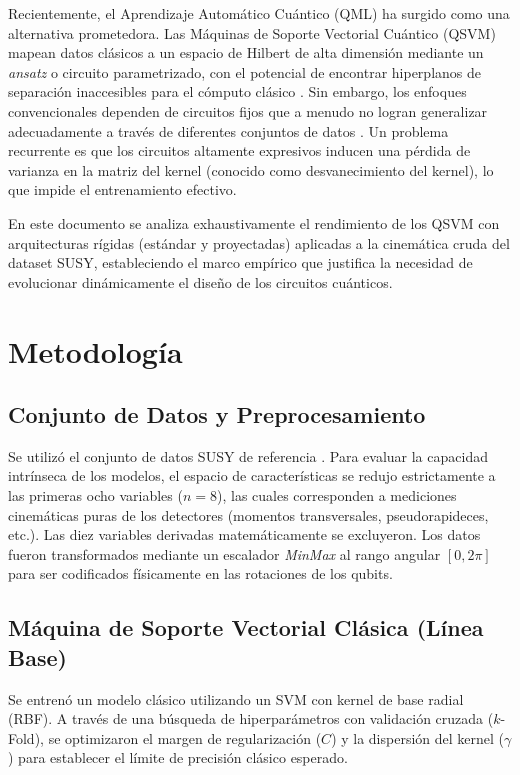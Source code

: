\documentclass[11pt,a4paper]{article}
\begin{document}
Recientemente, el Aprendizaje Automático Cuántico (QML) ha surgido como una alternativa prometedora. Las Máquinas de Soporte Vectorial Cuántico (QSVM) mapean datos clásicos a un espacio de Hilbert de alta dimensión mediante un \textit{ansatz} o circuito parametrizado, con el potencial de encontrar hiperplanos de separación inaccesibles para el cómputo clásico \cite{havlicek2019}. Sin embargo, los enfoques convencionales dependen de circuitos fijos que a menudo no logran generalizar adecuadamente a través de diferentes conjuntos de datos \cite{nguyen2026}. Un problema recurrente es que los circuitos altamente expresivos inducen una pérdida de varianza en la matriz del kernel (conocido como desvanecimiento del kernel), lo que impide el entrenamiento efectivo.

En este documento se analiza exhaustivamente el rendimiento de los QSVM con arquitecturas rígidas (estándar y proyectadas) aplicadas a la cinemática cruda del dataset SUSY, estableciendo el marco empírico que justifica la necesidad de evolucionar dinámicamente el diseño de los circuitos cuánticos.

\section{Metodología}

\subsection{Conjunto de Datos y Preprocesamiento}
Se utilizó el conjunto de datos SUSY de referencia \cite{baldi2014}. Para evaluar la capacidad intrínseca de los modelos, el espacio de características se redujo estrictamente a las primeras ocho variables ($n=8$), las cuales corresponden a mediciones cinemáticas puras de los detectores (momentos transversales, pseudorapideces, etc.). Las diez variables derivadas matemáticamente se excluyeron. Los datos fueron transformados mediante un escalador \textit{MinMax} al rango angular $[0, 2\pi]$ para ser codificados físicamente en las rotaciones de los qubits.

\subsection{Máquina de Soporte Vectorial Clásica (Línea Base)}
Se entrenó un modelo clásico utilizando un SVM con kernel de base radial (RBF). A través de una búsqueda de hiperparámetros con validación cruzada ($k$-Fold), se optimizaron el margen de regularización ($C$) y la dispersión del kernel ($\gamma$) para establecer el límite de precisión clásico esperado.
\end{document}
